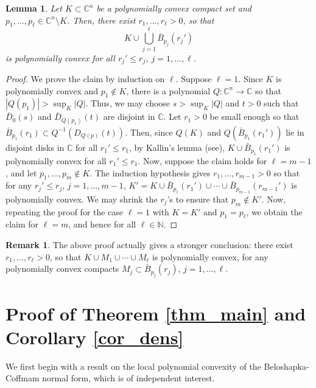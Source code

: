 \documentclass[10pt]{amsart}
\numberwithin{equation}{section}
\theoremstyle{definition}
\theoremstyle{definition}
\newtheorem*{rmk}{Remark}
\theoremstyle{plain}
\newtheorem{lemma}[theorem]{Lemma}
\newcommand{\bes} {\begin{equation*}}
\newcommand{\ees} {\end{equation*}}
\newcommand{\Cn}{\mathbb{C}^n}
\newcommand{\C} {\mathbb{C}}
\newcommand{\N} {\mathbb{N}}
\begin{document}
\begin{lemma}\label{lem_union}
	Let $K\subset \Cn$ be a polynomially convex compact set and $p_1,...,p_\ell\in\Cn\setminus K$. Then, there exist $r_1,...,r_\ell>0$, so that
		\bes		
			K\cup\bigcup_{j=1}^\ell\bar B_{p_j}(r_j')
		\ees
	is polynomially convex for all $r_j'\leq r_j$, $j=1,...,\ell$.
\end{lemma}
\begin{proof} We prove the claim by induction on $\ell$. Suppose $\ell=1$. Since $K$ is polynomially convex and $p_1\notin K$, there is a polynomial $Q:\Cn\rightarrow\C$ so that $|Q(p_1)|>\sup_{K}|Q|$. Thus, we may choose $s>\sup_K|Q|$ and $t>0$ such that $\bar D_0(s)$ and $\bar D_{Q(p_1)}(t)$ are disjoint in $\C$. Let $r_1>0$ be small enough so that $\bar B_{p_1}(r_1)\subset Q^{-1}(D_{Q(p)}(t))$. Then, since $Q(K)$ and $Q\left(\bar B_{p_1}(r_1')\right)$ lie in disjoint disks in $\C$ for all $r_1'\leq r_1$, by Kallin's lemma (see\cite{St07}), $K\cup \bar B_{p_1}(r_1')$ is polynomially convex for all $r_1'\leq r_1$. Now, suppose the claim holds for $\ell=m-1$, and let $p_1,...,p_m\notin K$. The induction hypothesis gives $r_1,...,r_{m-1}>0$ so that for any $r_j'\leq r_j$, $j=1,...,m-1$, $K'=K\cup\bar B_{p_1}(r_1')\cup\cdots\cup\bar B_{p_{m-1}}(r_{m-1}')$ is polynomially convex. We may shrink the $r_j$'s to ensure that $p_m\notin K'$. Now, repeating the proof for the case $\ell=1$ with $K=K'$ and $p_1=p_\ell$, we obtain the claim for $\ell=m$, and hence for all $\ell\in\N$. 
 \end{proof}

\begin{rmk} The above proof actually gives a stronger conclusion:   there exist $r_1,...,r_\ell>0$, so that $K\cup M_1\cup\cdots \cup M_\ell$ is polynomially convex, for any polynomially convex compacts $M_j\subset\bar B_{p_j}(r_j)$, $j=1,...,\ell$.
\end{rmk}

\section{Proof of Theorem \ref{thm_main} and Corollary \ref{cor_dens}}
\label{sec_thm1}	

We first begin with a result on the local polynomial convexity of the Beloshapka-Coffmam normal form, which is of independent interest. 
\end{document}
